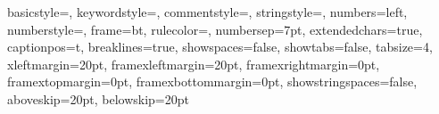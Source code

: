 
\lstset
{
    basicstyle=\footnotesize\ttfamily,
    keywordstyle=\color{blue}, %
    commentstyle=\color{OliveGreen},
    stringstyle=\color{BrickRed},
    numbers=left,
    numberstyle=\color{Gray}\tiny\sf,
    frame=bt, %
    rulecolor=\color{Gray},
    numbersep=7pt,
    extendedchars=true,
    captionpos=t, %
    breaklines=true,
    showspaces=false,
    showtabs=false,
    tabsize=4, 
    xleftmargin=20pt,
    framexleftmargin=20pt,
    framexrightmargin=0pt,
    framextopmargin=0pt,
    framexbottommargin=0pt,
    showstringspaces=false,
    aboveskip=20pt,
    belowskip=20pt
}


%

